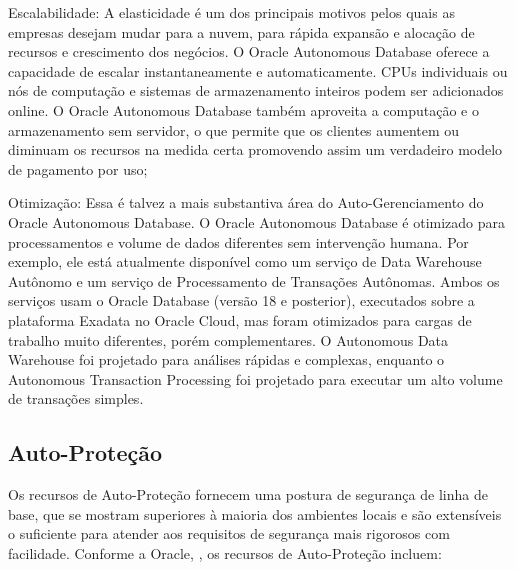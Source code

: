 \begin{alineas}
\item Escalabilidade: A elasticidade é um dos principais motivos pelos quais as empresas desejam mudar para a nuvem, para rápida expansão e alocação de recursos e crescimento dos negócios. O Oracle Autonomous Database oferece a capacidade de escalar instantaneamente e automaticamente. CPUs individuais ou nós de computação e sistemas de armazenamento inteiros podem ser adicionados online. O Oracle Autonomous Database também aproveita a computação e o armazenamento sem servidor, o que permite que os clientes aumentem ou diminuam os recursos na medida certa promovendo assim um verdadeiro modelo de pagamento por uso;

\item Otimização: Essa é talvez a mais substantiva área do Auto-Gerenciamento do Oracle Autonomous Database. O Oracle Autonomous Database é otimizado para processamentos e volume de dados diferentes sem intervenção humana. Por exemplo, ele está atualmente disponível como um serviço de Data Warehouse Autônomo e um serviço de Processamento de Transações Autônomas. Ambos os serviços usam o Oracle Database (versão 18 e posterior), executados sobre a plataforma Exadata no Oracle Cloud, mas foram otimizados para cargas de trabalho muito diferentes, porém complementares. O Autonomous Data Warehouse foi projetado para análises rápidas e complexas, enquanto o Autonomous Transaction Processing foi projetado para executar um alto volume de transações simples.
\end{alineas}



\subsection{Auto-Proteção}

Os recursos de Auto-Proteção fornecem uma postura de segurança de linha de base, que se mostram superiores à maioria dos ambientes locais e são extensíveis o suficiente para atender aos requisitos de segurança mais rigorosos com facilidade. Conforme a Oracle, \cite{WPProtecao}, os recursos de Auto-Proteção incluem:

